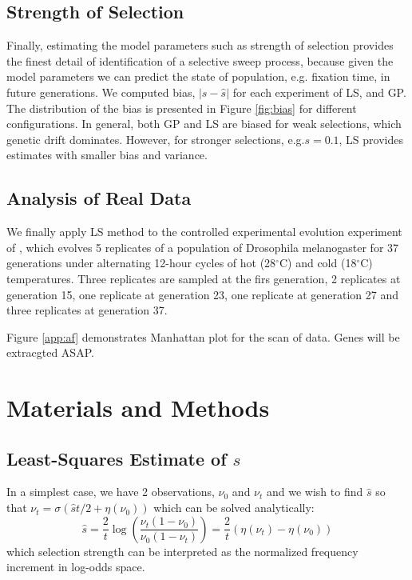 \documentclass[11pt]{article}
\begin{document}
\subsection{Strength of  Selection}
Finally, estimating the model parameters such as strength of selection provides 
the finest detail of identification of a selective sweep process, because given 
the model parameters we can predict the state of population, e.g. fixation 
time, in future generations. We computed bias, $|s-\hat{s}|$ for each 
experiment of LS, and GP. The distribution of the bias is presented in Figure 
\ref{fig:bias} for different configurations. In general, both GP and  LS are 
biased for weak selections, which genetic drift dominates. However, for 
stronger selections, e.g.$s=0.1$, LS provides estimates with smaller bias and 
variance.

\subsection{Analysis of Real Data}
We finally apply LS method to the controlled experimental evolution experiment 
of \cite{orozco2012adaptation}, which evolves 5 replicates of a population of 
Drosophila melanogaster for 37 generations under alternating 12-hour cycles of 
hot (28$^{\circ}$C) and cold (18$^{\circ}$C) temperatures. Three replicates are 
sampled at the firs generation, 2 replicates at generation 15, one replicate at 
generation 23, one replicate at generation 27 and three replicates at 
generation 37.

Figure \ref{app:af} demonstrates Manhattan plot for the scan of data. Genes 
will be extracgted ASAP.

\section{Materials and Methods}
\subsection{Least-Squares Estimate of $s$} 
\label{sec:regression}
In a simplest case, we have 2 observations, $\nu_0$ and $\nu_t$ and we wish to 
find 
$\hat{s}$ so that $\nu_t=\sigma(\hat{s}t/2+\eta(\nu_0))$ which can be solved 
analytically:
\begin{equation}
\hat{s}=\frac{2}{t} \log \left( \frac{\nu_t(1-\nu_0)}{\nu_0 (1-\nu_t)} \right) 
= 
\frac{2}{t}  \left( \eta(\nu_t)-\eta(\nu_0)\right)
\label{eq:naive2point}
\end{equation}
which selection strength can be interpreted as the normalized frequency 
increment in log-odds space.
\end{document}
